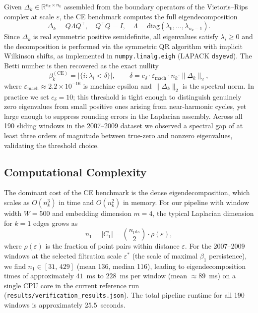 \documentclass[conference,10pt]{IEEEtran}
\begin{document}
Given $\Delta_k\in\mathbb{R}^{n_k\times n_k}$ assembled from the
boundary operators of the Vietoris--Rips complex at scale
$\varepsilon$, the CE benchmark computes the full eigendecomposition
\begin{equation}
  \Delta_k = Q\Lambda Q^\top,\quad
  Q^\top Q = I,\quad
  \Lambda=\mathrm{diag}(\lambda_0,\ldots,\lambda_{n_k-1}).
  \label{eq:eig}
\end{equation}
Since $\Delta_k$ is real symmetric positive semidefinite, all
eigenvalues satisfy $\lambda_i\ge 0$ and the decomposition is
performed via the symmetric QR algorithm with implicit Wilkinson
shifts, as implemented in \texttt{numpy.linalg.eigh} (LAPACK
\texttt{dsyevd}). The Betti number is then recovered as the exact
nullity
\begin{equation}
  \beta_k^{(\mathrm{CE})} = |\{i:\lambda_i<\delta\}|,\qquad
  \delta = c_\delta\cdot\varepsilon_{\mathrm{mach}}\cdot n_k
           \cdot\|\Delta_k\|_2,
  \label{eq:ce_betti}
\end{equation}
where $\varepsilon_{\mathrm{mach}}\approx 2.2\times 10^{-16}$ is
machine epsilon and $\|\Delta_k\|_2$ is the spectral norm. In practice
we set $c_\delta=10$; this threshold is tight enough to distinguish
genuinely zero eigenvalues from small positive ones arising from
near-harmonic cycles, yet large enough to suppress rounding errors in
the Laplacian assembly. Across all 190 sliding windows in the
2007--2009 dataset we observed a spectral gap of at least three orders
of magnitude between true-zero and nonzero eigenvalues, validating the
threshold choice.

\subsection{Computational Complexity}

The dominant cost of the CE benchmark is the dense eigendecomposition,
which scales as $O(n_k^3)$ in time and $O(n_k^2)$ in memory. For our
pipeline with window width $W=500$ and embedding dimension $m=4$, the
typical Laplacian dimension for $k=1$ edges grows as
\begin{equation}
  n_1 = |C_1| = \binom{n_{\mathrm{pts}}}{2}\cdot\rho(\varepsilon),
\end{equation}
where $\rho(\varepsilon)$ is the fraction of point pairs within
distance $\varepsilon$. For the 2007--2009 windows at the selected
filtration scale $\varepsilon^*$ (the scale of maximal $\beta_1$
persistence), we find $n_1\in[31,\,429]$ (mean 136, median 116),
leading to eigendecomposition times of approximately $41$~ms to
$228$~ms per window (mean $\approx 89$~ms) on a single CPU core in the
current reference run (\texttt{results/verification\_results.json}).
The total pipeline runtime for all 190 windows is approximately
$25.5$~seconds.
\end{document}
